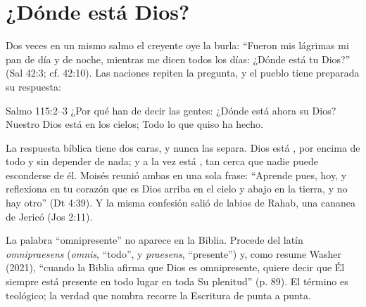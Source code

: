 
\section{¿Dónde está Dios?}

Dos veces en un mismo salmo el creyente oye la burla: ``Fueron mis lágrimas mi pan de día y de noche, mientras me dicen todos los días: ¿Dónde está tu Dios?'' (Sal 42:3; cf. 42:10). Las naciones repiten la pregunta, y el pueblo tiene preparada su respuesta:

\begin{verso}{Salmo 115:2–3}
¿Por qué han de decir las gentes: ¿Dónde está ahora su Dios? Nuestro Dios está en los cielos; Todo lo que quiso ha hecho.
\end{verso}

La respuesta bíblica tiene dos caras, y nunca las separa. Dios está , por encima de todo y sin depender de nada; y a la vez está , tan cerca que nadie puede esconderse de él. Moisés reunió ambas en una sola frase: ``Aprende pues, hoy, y reflexiona en tu corazón que \SENOR{} es Dios arriba en el cielo y abajo en la tierra, y no hay otro'' (Dt 4:39). Y la misma confesión salió de labios de Rahab, una cananea de Jericó (Jos 2:11).

La palabra ``omnipresente'' no aparece en la Biblia. Procede del latín \emph{omnipraesens} (\emph{omnis}, ``todo'', y \emph{praesens}, ``presente'') y, como resume Washer (2021), ``cuando la Biblia afirma que Dios es omnipresente, quiere decir que Él siempre está presente en todo lugar en toda Su plenitud'' (p. 89). El término es teológico; la verdad que nombra recorre la Escritura de punta a punta.

